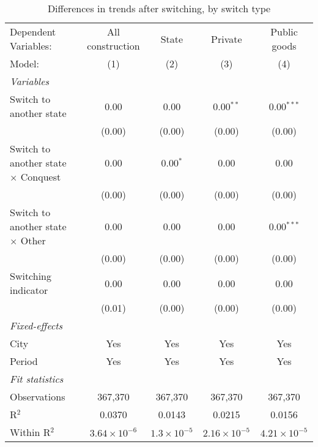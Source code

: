 \begin{table}[htbp]
   \caption{\label{tab:window_1y} Differences in trends after switching, by switch type}
   \centering
   \begin{tabular}{lcccc}
      \tabularnewline \midrule \midrule
      Dependent Variables:                       & All construction      & State                & Private               & Public goods\\  
      Model:                                     & (1)                   & (2)                  & (3)                   & (4)\\  
      \midrule
      \emph{Variables}\\
      Switch to another state                    & 0.00                  & 0.00                 & 0.00$^{**}$           & 0.00$^{***}$\\   
                                                 & (0.00)                & (0.00)               & (0.00)                & (0.00)\\   
      Switch to another state $\times$ Conquest  & 0.00                  & 0.00$^{*}$           & 0.00                  & 0.00\\   
                                                 & (0.00)                & (0.00)               & (0.00)                & (0.00)\\   
      Switch to another state $\times$ Other     & 0.00                  & 0.00                 & 0.00                  & 0.00$^{***}$\\   
                                                 & (0.00)                & (0.00)               & (0.00)                & (0.00)\\   
      Switching indicator                        & 0.00                  & 0.00                 & 0.00                  & 0.00\\   
                                                 & (0.01)                & (0.00)               & (0.00)                & (0.00)\\   
      \midrule
      \emph{Fixed-effects}\\
      City                                       & Yes                   & Yes                  & Yes                   & Yes\\  
      Period                                     & Yes                   & Yes                  & Yes                   & Yes\\  
      \midrule
      \emph{Fit statistics}\\
      Observations                               & 367,370               & 367,370              & 367,370               & 367,370\\  
      R$^2$                                      & 0.0370                & 0.0143               & 0.0215                & 0.0156\\  
      Within R$^2$                               & $3.64\times 10^{-6}$  & $1.3\times 10^{-5}$  & $2.16\times 10^{-5}$  & $4.21\times 10^{-5}$\\   
      \midrule \midrule
      

\end{tabular}
\end{table}
